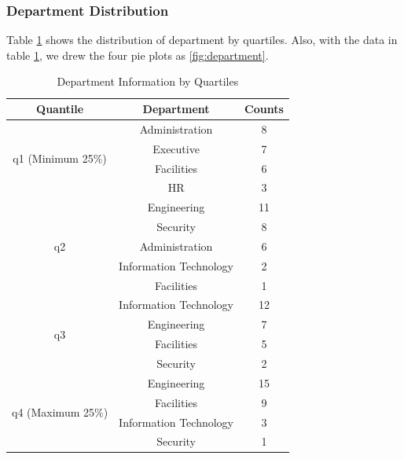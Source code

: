 \documentclass[aps, 10pt, a4paper]{article}
\begin{document}
            \subsubsection{Department Distribution}
                Table \ref{tb:movequantile} shows the distribution of department by quartiles. Also, with the data in table \ref{tb:movequantile}, we drew the four pie plots as \ref{fig:department}.
                
                \begin{table}[htbp]
                    \centering
                    \caption{Department Information by Quartiles}
                    \label{tb:movequantile}
                    \begin{tabular}{c|cc}
                        Quantile & Department & Counts \\ \hline
                        \multirow{4}{*}{q1 (Minimum 25\%)} & Administration & 8 \\
                        & Executive & 7 \\
                        & Facilities & 6 \\
                        & HR & 3 \\ \hline
                        \multirow{5}{*}{q2} & Engineering & 11 \\
                        & Security & 8 \\
                        & Administration & 6 \\
                        & Information Technology & 2 \\
                        & Facilities & 1 \\ \hline
                        \multirow{4}{*}{q3} & Information Technology & 12 \\
                        & Engineering & 7 \\
                        & Facilities & 5 \\
                        & Security & 2 \\ \hline
                        \multirow{4}{*}{q4 (Maximum 25\%)} & Engineering & 15 \\
                        & Facilities & 9 \\
                        & Information Technology & 3 \\
                        & Security & 1 \\
                    \end{tabular}
                \end{table}
                
\end{document}
